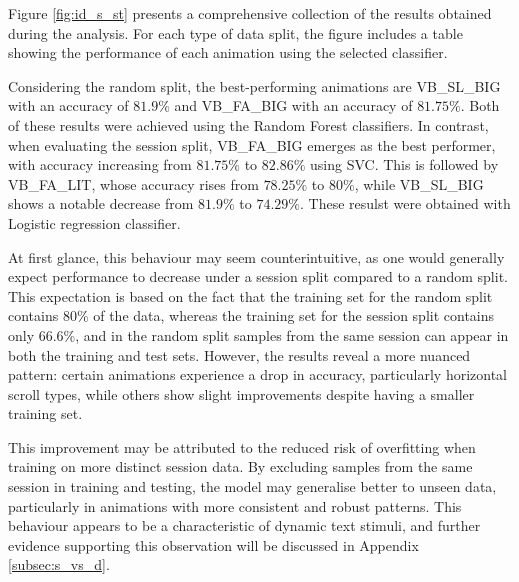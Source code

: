 \documentclass{article}
\begin{document}
Figure \ref{fig:id_s_st} presents a comprehensive collection of the results obtained during the analysis. 
For each type of data split, the figure includes a table showing the performance of each animation using the selected classifier.

Considering the random split, the best-performing animations are VB\_SL\_BIG with an accuracy of $81.9\%$ and VB\_FA\_BIG with an accuracy of $81.75\%$.
Both of these results were achieved using the Random Forest classifiers. 
In contrast, when evaluating the session split, VB\_FA\_BIG emerges as the best performer, with accuracy increasing from $81.75\%$ to $82.86\%$ using SVC. 
This is followed by VB\_FA\_LIT, whose accuracy rises from $78.25\%$ to $80\%$, while VB\_SL\_BIG shows a notable decrease from $81.9\%$ to $74.29\%$.
These resulst were obtained with Logistic regression classifier.

At first glance, this behaviour may seem counterintuitive, as one would generally expect performance to decrease under a session split compared to a random split. 
This expectation is based on the fact that the training set for the random split contains 80\% of the data, whereas the training set for the session split contains only 66.6\%, and in the random split samples from the same session can appear in both the training and test sets. 
However, the results reveal a more nuanced pattern: certain animations experience a drop in accuracy, particularly horizontal scroll types, while others show slight improvements despite having a smaller training set.

This improvement may be attributed to the reduced risk of overfitting when training on more distinct session data. 
By excluding samples from the same session in training and testing, the model may generalise better to unseen data, particularly in animations with more consistent and robust patterns. 
This behaviour appears to be a characteristic of dynamic text stimuli, and further evidence supporting this observation will be discussed in Appendix \ref{subsec:s_vs_d}.
\end{document}
